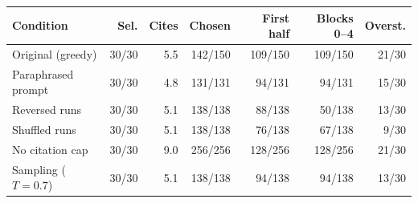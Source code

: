 \begin{tabular}{@{}lrrrrrr@{}}
\toprule
Condition & Sel. & Cites & Chosen & First half & Blocks 0--4 & Overst. \\
\midrule
Original (greedy) & 30/30 & 5.5 & 142/150 & 109/150 & 109/150 & 21/30 \\
Paraphrased prompt & 30/30 & 4.8 & 131/131 & 94/131 & 94/131 & 15/30 \\
Reversed runs & 30/30 & 5.1 & 138/138 & 88/138 & 50/138 & 13/30 \\
Shuffled runs & 30/30 & 5.1 & 138/138 & 76/138 & 67/138 & 9/30 \\
No citation cap & 30/30 & 9.0 & 256/256 & 128/256 & 128/256 & 21/30 \\
Sampling ($T{=}0.7$) & 30/30 & 5.1 & 138/138 & 94/138 & 94/138 & 13/30 \\
\bottomrule
\end{tabular}
